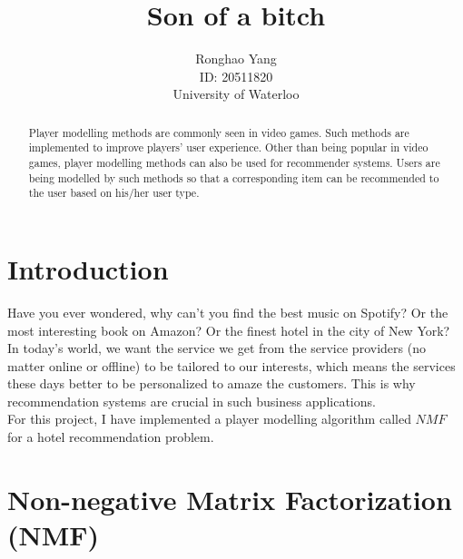 \documentclass[11pt]{article} %
\title{Son of a bitch}
\author{Ronghao Yang\\ID: 20511820\\University of Waterloo}
\begin{document}
\maketitle

\begin{abstract}
Player modelling methods are commonly seen in video games. Such methods are implemented to improve players' user experience. Other than being popular in video games, player modelling methods can also be used for recommender systems. Users are being modelled by such methods so that a corresponding item can be recommended to the user based on his/her user type.

\end{abstract}
\section{Introduction}
Have you ever wondered, why can't you find the best music on Spotify? Or the most interesting book on Amazon? Or the finest hotel in the city of New York? In today's world, we want the service we get from the service providers (no matter online or offline) to be tailored to our interests, which means the services these days better to be personalized to amaze the customers. This is why recommendation systems are crucial in such business applications.\\
For this project, I have implemented a player modelling algorithm called $NMF$ for a hotel recommendation problem. 
\section{Non-negative Matrix Factorization (NMF)}
\end{document}
